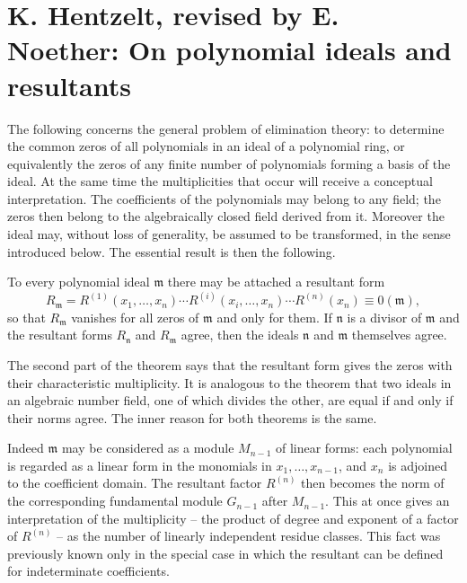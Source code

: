\documentclass[12pt]{article}
\begin{document}
\newpage

\section{K. Hentzelt, revised by E. Noether: On polynomial ideals and resultants}

The following concerns the general problem of elimination theory: to determine the common zeros of all polynomials in an ideal of a polynomial ring, or equivalently the zeros of any finite number of polynomials forming a basis of the ideal. At the same time the multiplicities that occur will receive a conceptual interpretation. The coefficients of the polynomials may belong to any field; the zeros then belong to the algebraically closed field derived from it. Moreover the ideal may, without loss of generality, be assumed to be transformed, in the sense introduced below. The essential result is then the following.

To every polynomial ideal $\mathfrak m$ there may be attached a resultant form
\begin{equation}
  R_{\mathfrak m}=R^{(1)}(x_1,\ldots,x_n)\cdots R^{(i)}(x_i,\ldots,x_n)\cdots R^{(n)}(x_n)\equiv 0(\mathfrak m),       \tag{A}
\end{equation}
so that $R_{\mathfrak m}$ vanishes for all zeros of $\mathfrak m$ and only for them. If $\mathfrak n$ is a divisor of $\mathfrak m$ and the resultant forms $R_{\mathfrak n}$ and $R_{\mathfrak m}$ agree, then the ideals $\mathfrak n$ and $\mathfrak m$ themselves agree.

The second part of the theorem says that the resultant form gives the zeros with their characteristic multiplicity. It is analogous to the theorem that two ideals in an algebraic number field, one of which divides the other, are equal if and only if their norms agree. The inner reason for both theorems is the same.

Indeed $\mathfrak m$ may be considered as a module $M_{n-1}$ of linear forms: each polynomial is regarded as a linear form in the monomials in $x_1,\ldots,x_{n-1}$, and $x_n$ is adjoined to the coefficient domain. The resultant factor $R^{(n)}$ then becomes the norm of the corresponding fundamental module $G_{n-1}$ after $M_{n-1}$. This at once gives an interpretation of the multiplicity -- the product of degree and exponent of a factor of $R^{(n)}$ -- as the number of linearly independent residue classes. This fact was previously known only in the special case in which the resultant can be defined for indeterminate coefficients.
\end{document}
